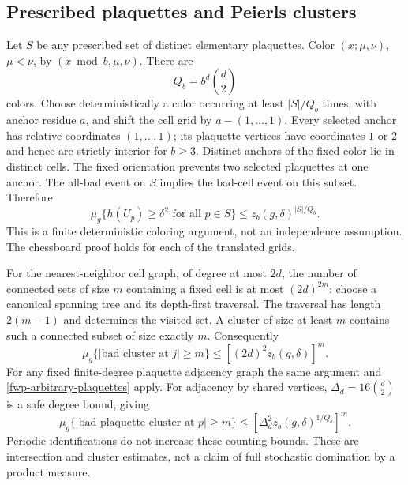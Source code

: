 \subsection{Prescribed plaquettes and Peierls clusters}
\label{fwp-color-section}

Let \(S\) be any prescribed set of distinct elementary plaquettes.
Color \((x;\mu,\nu)\), \(\mu<\nu\), by \((x\bmod b,\mu,\nu)\).
There are
\begin{equation}
 Q_b=b^d\binom d2
 \label{fwp-color-count}
\end{equation}
colors. Choose deterministically a color occurring at least
\(|S|/Q_b\) times, with anchor residue \(a\), and shift the cell grid
by \(a-(1,\ldots,1)\). Every selected anchor has relative coordinates
\((1,\ldots,1)\); its plaquette vertices have coordinates \(1\) or \(2\)
and hence are strictly interior for \(b\ge3\).
Distinct anchors of the fixed color lie in distinct cells.
The fixed orientation prevents two selected plaquettes at one anchor.
The all-bad event on \(S\) implies the bad-cell event on this subset.
Therefore
\begin{equation}
 \mu_g\{h(U_p)\ge\delta^2\text{ for all }p\in S\}
       \le z_b(g,\delta)^{|S|/Q_b}.
 \label{fwp-arbitrary-plaquettes}
\end{equation}
This is a finite deterministic coloring argument, not an independence
assumption. The chessboard proof holds for each of the translated grids.

For the nearest-neighbor cell graph, of degree at most \(2d\), the
number of connected sets of size \(m\) containing a fixed cell is at
most \((2d)^{2m}\): choose a canonical spanning tree and its depth-first
traversal. The traversal has length \(2(m-1)\) and determines the visited
set. A cluster of size at least \(m\) contains such a connected subset
of size exactly \(m\). Consequently
\begin{equation}
 \mu_g\{|\text{bad cluster at }j|\ge m\}
       \le[(2d)^2z_b(g,\delta)]^m.
 \label{fwp-cell-cluster}
\end{equation}
For any fixed finite-degree plaquette adjacency graph the same argument
and \eqref{fwp-arbitrary-plaquettes} apply. For adjacency by shared
vertices, \(\Delta_d=16\binom d2\) is a safe degree bound, giving
\begin{equation}
 \mu_g\{|\text{bad plaquette cluster at }p|\ge m\}
       \le[\Delta_d^2z_b(g,\delta)^{1/Q_b}]^m.
 \label{fwp-plaquette-cluster}
\end{equation}
Periodic identifications do not increase these counting bounds.
These are intersection and cluster estimates, not a claim of full
stochastic domination by a product measure.

